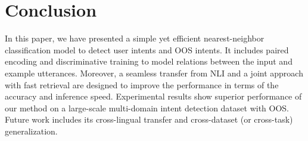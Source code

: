 \section{Conclusion}
In this paper, we have presented a simple yet efficient nearest-neighbor classification model to detect user intents and OOS intents.
It includes paired encoding and discriminative training to model relations between the input and example utterances.
Moreover, a seamless transfer from NLI and a joint approach with fast retrieval are designed to improve the performance in terms of the accuracy and inference speed.
Experimental results show superior performance of our method on a large-scale multi-domain intent detection dataset with OOS.
Future work includes its cross-lingual transfer and cross-dataset (or cross-task) generalization.

